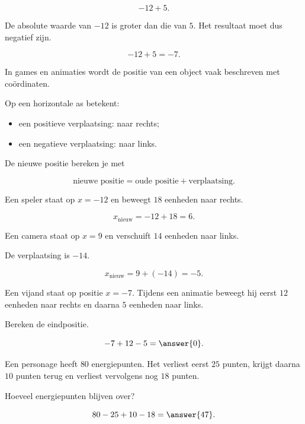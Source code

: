 \documentclass{ximera}
\begin{document}

\begin{example}
\[
-12+5.
\]

De absolute waarde van $-12$ is groter dan die van $5$. Het resultaat moet dus
negatief zijn.

\[
-12+5=-7.
\]
\end{example}


In games en animaties wordt de positie van een object vaak beschreven met
coördinaten.

Op een horizontale as betekent:

\begin{itemize}
    \item een positieve verplaatsing: naar rechts;
    \item een negatieve verplaatsing: naar links.
\end{itemize}

De nieuwe positie bereken je met

\[
\text{nieuwe positie}
=
\text{oude positie}
+
\text{verplaatsing}.
\]

\begin{example}
Een speler staat op $x=-12$ en beweegt $18$ eenheden naar rechts.

\[
x_{\text{nieuw}}
=
-12+18
=
6.
\]
\end{example}

\begin{example}
Een camera staat op $x=9$ en verschuift $14$ eenheden naar links.

De verplaatsing is $-14$.

\[
x_{\text{nieuw}}
=
9+(-14)
=
-5.
\]
\end{example}

\begin{problem}
Een vijand staat op positie $x=-7$. Tijdens een animatie beweegt hij eerst
$12$ eenheden naar rechts en daarna $5$ eenheden naar links.

Bereken de eindpositie.

\[
-7+12-5=\answer{0}.
\]
\end{problem}

\begin{problem}
Een personage heeft $80$ energiepunten. Het verliest eerst $25$ punten,
krijgt daarna $10$ punten terug en verliest vervolgens nog $18$ punten.

Hoeveel energiepunten blijven over?

\[
80-25+10-18=\answer{47}.
\]
\end{problem}
\end{document}
